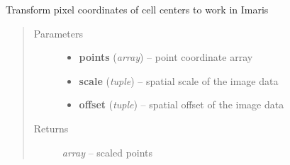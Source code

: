 \documentclass[letterpaper,10pt,english]{sphinxmanual}
\begin{document}
\begin{fulllineitems}
\label{api/ClearMap.IO:ClearMap.IO.Imaris.transformPointsToImaris}
Transform pixel coordinates of cell centers to work in Imaris
\begin{quote}\begin{description}
\item[{Parameters}] \leavevmode\begin{itemize}
\item {} 
\textbf{points} (\emph{array}) --
point coordinate array

\item {} 
\textbf{scale} (\emph{tuple}) --
spatial scale of the image data

\item {} 
\textbf{offset} (\emph{tuple}) --
spatial offset of the image data

\end{itemize}

\item[{Returns}] \leavevmode
\emph{array} --
scaled points

\end{description}\end{quote}

\end{fulllineitems}

\end{document}
